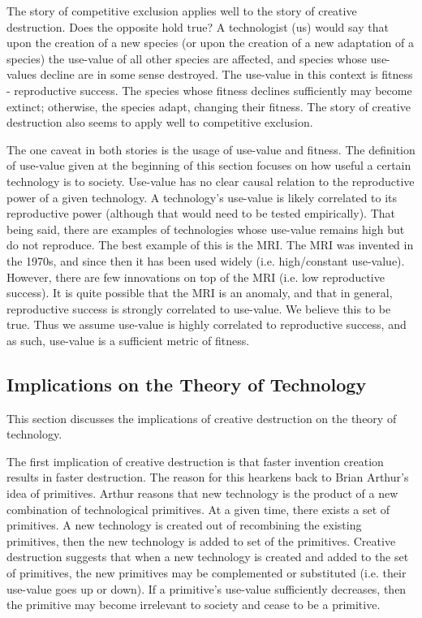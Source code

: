\documentclass[11pt]{article}
\begin{document}
The story of competitive exclusion applies well to the story of creative destruction.
Does the opposite hold true?
A technologist (us) would say that upon the creation of a new species (or upon the creation of a new adaptation of a species) the use-value of all other species are affected, and species whose use-values decline are in some sense destroyed. 
The use-value in this context is fitness - reproductive success.
The species whose fitness declines sufficiently may become extinct; otherwise, the species adapt, changing their fitness. 
The story of creative destruction also seems to apply well to competitive exclusion.

The one caveat in both stories is the usage of use-value and fitness. 
The definition of use-value given at the beginning of this section focuses on how useful a certain technology is to society. 
Use-value has no clear causal relation to the reproductive power of a given technology. 
A technology's use-value is likely correlated to its reproductive power (although that would need to be tested empirically).
That being said, there are examples of technologies whose use-value remains high but do not reproduce. 
The best example of this is the MRI.
The MRI was invented in the 1970s, and since then it has been used widely (i.e. high/constant use-value).
However, there are few innovations on top of the MRI (i.e. low reproductive success). 
It is quite possible that the MRI is an anomaly, and that in general, reproductive success is strongly correlated to use-value. 
We believe this to be true.
Thus we assume use-value is highly correlated to reproductive success, and as such, use-value is a sufficient metric of fitness.

\subsection{Implications on the Theory of Technology}
This section discusses the implications of creative destruction on the theory of technology.

The first implication of creative destruction is that faster invention creation results in faster destruction.
The reason for this hearkens back to Brian Arthur's idea of primitives. 
Arthur reasons that new technology is the product of a new combination of technological primitives. 
At a given time, there exists a set of primitives. 
A new technology is created out of recombining the existing primitives, then the new technology is added to set of the primitives.
Creative destruction suggests that when a new technology is created and added to the set of primitives, the new primitives may be complemented or substituted (i.e. their use-value goes up or down).
If a primitive's use-value sufficiently decreases, then the primitive may become irrelevant to society and cease to be a primitive.
\end{document}
